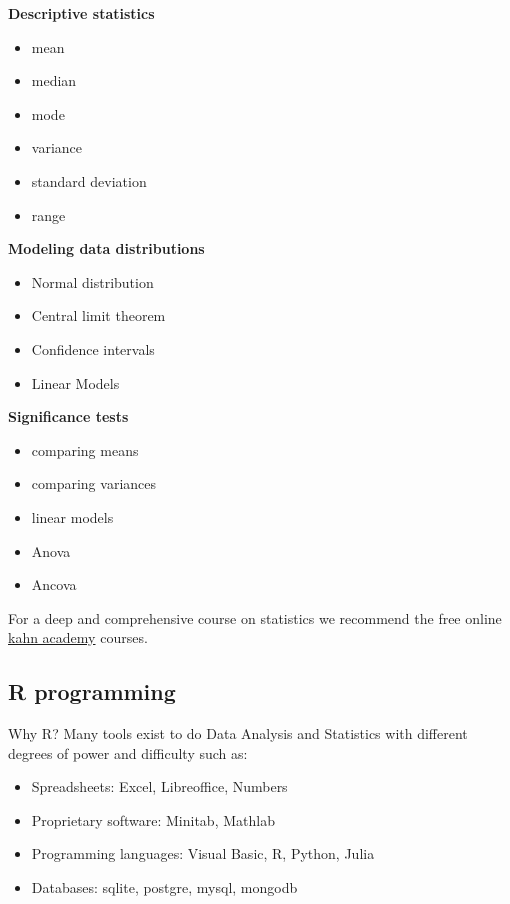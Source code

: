 \documentclass[
]{book}
\providecommand{\tightlist}{%
  \setlength{\itemsep}{0pt}\setlength{\parskip}{0pt}}
\begin{document}
\textbf{Descriptive statistics}

\begin{itemize}
\tightlist
\item
  mean
\item
  median
\item
  mode
\item
  variance
\item
  standard deviation
\item
  range
\end{itemize}

\textbf{Modeling data distributions}

\begin{itemize}
\tightlist
\item
  Normal distribution
\item
  Central limit theorem
\item
  Confidence intervals
\item
  Linear Models
\end{itemize}

\textbf{Significance tests}

\begin{itemize}
\tightlist
\item
  comparing means
\item
  comparing variances
\item
  linear models
\item
  Anova
\item
  Ancova
\end{itemize}

For a deep and comprehensive course on statistics we recommend the free online \href{https://www.khanacademy.org/math/statistics-probability}{kahn academy} courses.

\hypertarget{r-programming}{%
\subsection{R programming}\label{r-programming}}

Why R? Many tools exist to do Data Analysis and Statistics with different degrees of power and difficulty such as:

\begin{itemize}
\tightlist
\item
  Spreadsheets: Excel, Libreoffice, Numbers
\item
  Proprietary software: Minitab, Mathlab
\item
  Programming languages: Visual Basic, R, Python, Julia
\item
  Databases: sqlite, postgre, mysql, mongodb
\end{itemize}
\end{document}
